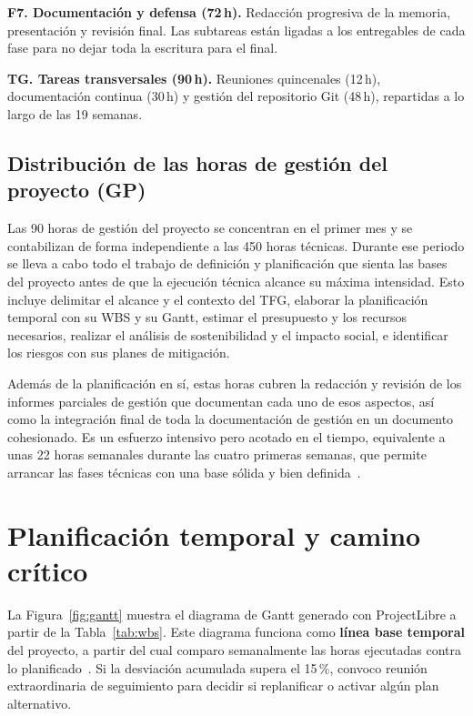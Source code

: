 \documentclass[11pt,a4paper]{article}
\begin{document}
\textbf{F7. Documentación y defensa (72\,h).} Redacción progresiva de la memoria, presentación y revisión final. Las subtareas están ligadas a los entregables de cada fase para no dejar toda la escritura para el final.

\textbf{TG. Tareas transversales (90\,h).} Reuniones quincenales (12\,h), documentación continua (30\,h) y gestión del repositorio Git (48\,h), repartidas a lo largo de las 19 semanas.

\subsection{Distribución de las horas de gestión del proyecto (GP)}

Las 90 horas de gestión del proyecto se concentran en el primer mes y se contabilizan de forma independiente a las 450 horas técnicas. Durante ese periodo se lleva a cabo todo el trabajo de definición y planificación que sienta las bases del proyecto antes de que la ejecución técnica alcance su máxima intensidad. Esto incluye delimitar el alcance y el contexto del TFG, elaborar la planificación temporal con su WBS y su Gantt, estimar el presupuesto y los recursos necesarios, realizar el análisis de sostenibilidad y el impacto social, e identificar los riesgos con sus planes de mitigación.

Además de la planificación en sí, estas horas cubren la redacción y revisión de los informes parciales de gestión que documentan cada uno de esos aspectos, así como la integración final de toda la documentación de gestión en un documento cohesionado. Es un esfuerzo intensivo pero acotado en el tiempo, equivalente a unas 22 horas semanales durante las cuatro primeras semanas, que permite arrancar las fases técnicas con una base sólida y bien definida~\cite{gep23}.

\section{Planificación temporal y camino crítico}

La Figura~\ref{fig:gantt} muestra el diagrama de Gantt generado con ProjectLibre a partir de la Tabla~\ref{tab:wbs}. Este diagrama funciona como \textbf{línea base temporal} del proyecto, a partir del cual comparo semanalmente las horas ejecutadas contra lo planificado~\cite{pmbok,iso21502}. Si la desviación acumulada supera el 15\,\%, convoco reunión extraordinaria de seguimiento para decidir si replanificar o activar algún plan alternativo.
\end{document}
